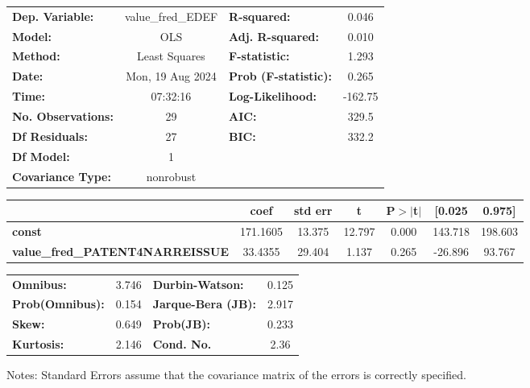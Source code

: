 \begin{center}
\begin{tabular}{lclc}
\toprule
\textbf{Dep. Variable:}                 & value\_fred\_EDEF & \textbf{  R-squared:         } &     0.046   \\
\textbf{Model:}                         &        OLS        & \textbf{  Adj. R-squared:    } &     0.010   \\
\textbf{Method:}                        &   Least Squares   & \textbf{  F-statistic:       } &     1.293   \\
\textbf{Date:}                          &  Mon, 19 Aug 2024 & \textbf{  Prob (F-statistic):} &    0.265    \\
\textbf{Time:}                          &      07:32:16     & \textbf{  Log-Likelihood:    } &   -162.75   \\
\textbf{No. Observations:}              &           29      & \textbf{  AIC:               } &     329.5   \\
\textbf{Df Residuals:}                  &           27      & \textbf{  BIC:               } &     332.2   \\
\textbf{Df Model:}                      &            1      & \textbf{                     } &             \\
\textbf{Covariance Type:}               &     nonrobust     & \textbf{                     } &             \\
\bottomrule
\end{tabular}
\begin{tabular}{lcccccc}
                                        & \textbf{coef} & \textbf{std err} & \textbf{t} & \textbf{P$> |$t$|$} & \textbf{[0.025} & \textbf{0.975]}  \\
\midrule
\textbf{const}                          &     171.1605  &       13.375     &    12.797  &         0.000        &      143.718    &      198.603     \\
\textbf{value\_fred\_PATENT4NARREISSUE} &      33.4355  &       29.404     &     1.137  &         0.265        &      -26.896    &       93.767     \\
\bottomrule
\end{tabular}
\begin{tabular}{lclc}
\textbf{Omnibus:}       &  3.746 & \textbf{  Durbin-Watson:     } &    0.125  \\
\textbf{Prob(Omnibus):} &  0.154 & \textbf{  Jarque-Bera (JB):  } &    2.917  \\
\textbf{Skew:}          &  0.649 & \textbf{  Prob(JB):          } &    0.233  \\
\textbf{Kurtosis:}      &  2.146 & \textbf{  Cond. No.          } &     2.36  \\
\bottomrule
\end{tabular}
\end{center}

Notes: \newline
 [1] Standard Errors assume that the covariance matrix of the errors is correctly specified.